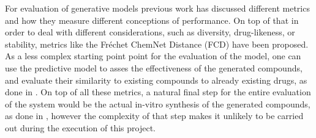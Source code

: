 \documentclass{article}
\begin{document}
For evaluation of generative models previous work \cite{Theis2016} has discussed
different metrics and how they measure different conceptions of performance. On top of
that in order to deal with different considerations, such as diversity, drug-likeness,
or stability, metrics like the Fréchet ChemNet Distance (FCD) \cite{Preuer} have been
proposed. As a less complex starting point point for the evaluation of the model, one
can use the predictive model to asses the effectiveness of the generated compounds, and
evaluate their similarity to existing compounds to already existing drugs, as done in
\cite{Born2019}. On top of all these metrics, a natural final step for the entire
evaluation of the system would be the actual in-vitro synthesis of the generated
compounds, as done in \cite{Zhavoronkov2019}, however the complexity of that step makes
it unlikely to be carried out during the execution of this project. 









    
\end{document}
